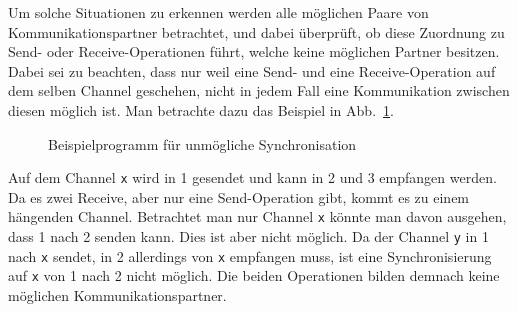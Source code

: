 Um solche Situationen zu erkennen werden alle möglichen Paare von Kommunikationspartner
betrachtet, und dabei überprüft, ob diese Zuordnung zu Send- oder Receive-Operationen führt, 
welche keine möglichen Partner besitzen. Dabei sei zu beachten, dass nur weil eine Send- und eine 
Receive-Operation auf dem selben Channel geschehen, nicht 
in jedem Fall eine Kommunikation zwischen diesen möglich ist. Man betrachte dazu das Beispiel in 
Abb.~\ref{Chap:Analyze-Sec:Channel-SubSec:Dangling-Fig:NoSync}.
\begin{figure}[h!]
  
  \caption{Beispielprogramm für unmögliche Synchronisation}
  \label{Chap:Analyze-Sec:Channel-SubSec:Dangling-Fig:NoSync}
\end{figure}
Auf dem Channel \texttt{x} wird in 1 gesendet und kann in 2 und 3 empfangen werden. Da es zwei Receive, 
aber nur eine Send-Operation gibt, kommt es zu einem hängenden Channel. Betrachtet man nur 
Channel \texttt{x} könnte man davon ausgehen, dass 1 nach 2 senden kann. 
Dies ist aber nicht möglich. Da der Channel \texttt{y} in 1 nach \texttt{x} sendet, 
in 2 allerdings von \texttt{x} empfangen muss, ist eine Synchronisierung auf \texttt{x} von 1 nach 
2 nicht möglich. Die beiden Operationen bilden demnach keine möglichen Kommunikationspartner.

